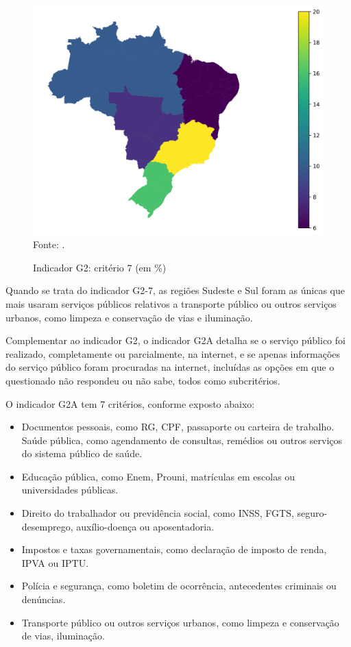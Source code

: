 \begin{figure}[H]
	\centering
	\caption{Indicador G2: critério 7 (em \%)}
	\includegraphics[width=1\linewidth]{figuras/mapa_coropletico_tic_domicilios_2024_g2_7.png}
	\label{fig:mapa_coropletico_tic_domicilios_2024_g2_7}
	\footnotesize{Fonte: \cite{tic_domicilios_2024_g2}.}
\end{figure}

Quando se trata do indicador G2-7, as regiões Sudeste e Sul foram as únicas que mais usaram serviços públicos relativos a transporte público ou outros serviços urbanos, como limpeza e conservação de vias e iluminação.

Complementar ao indicador G2, o indicador G2A detalha se o serviço público foi realizado, completamente ou parcialmente, na internet, e se apenas informações do serviço público foram procuradas na internet, incluídas as opções em que o questionado não respondeu ou não sabe, todos como subcritérios. 

O indicador G2A tem 7 critérios, conforme exposto abaixo:

\begin{itemize}
	\item Documentos pessoais, como RG, CPF, passaporte ou carteira de trabalho.
	Saúde pública, como agendamento de consultas, remédios ou outros serviços do sistema público de saúde.
	\item Educação pública, como Enem, Prouni, matrículas em escolas ou universidades públicas.
	\item Direito do trabalhador ou previdência social, como INSS, FGTS, seguro-desemprego, auxílio-doença ou aposentadoria.
	\item Impostos e taxas governamentais, como declaração de imposto de renda, IPVA ou IPTU.
	\item Polícia e segurança, como boletim de ocorrência, antecedentes criminais ou denúncias.
	\item Transporte público ou outros serviços urbanos, como limpeza e conservação de vias, iluminação.
\end{itemize}

